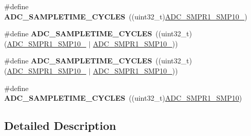 \begin{DoxyCompactItemize}
\#define {\bfseries A\+D\+C\+\_\+\+S\+A\+M\+P\+L\+E\+T\+I\+M\+E\+\_\+C\+Y\+C\+L\+ES}~((uint32\+\_\+t)\mbox{\hyperlink{group___peripheral___registers___bits___definition_ga289d89b4d92d7f685a8e44aeb9ddcded}{A\+D\+C\+\_\+\+S\+M\+P\+R1\+\_\+\+S\+M\+P10\+\_}})
\item 
\mbox{\label{group___a_d_c__sampling__times_ga37d00fbf996e8995c5dd46fc992f027c}} 
\#define {\bfseries A\+D\+C\+\_\+\+S\+A\+M\+P\+L\+E\+T\+I\+M\+E\+\_\+C\+Y\+C\+L\+ES}~((uint32\+\_\+t)(\mbox{\hyperlink{group___peripheral___registers___bits___definition_ga289d89b4d92d7f685a8e44aeb9ddcded}{A\+D\+C\+\_\+\+S\+M\+P\+R1\+\_\+\+S\+M\+P10\+\_}} $\vert$ \mbox{\hyperlink{group___peripheral___registers___bits___definition_ga8a8996c53042759f01e966fb00351ebf}{A\+D\+C\+\_\+\+S\+M\+P\+R1\+\_\+\+S\+M\+P10\+\_}}))
\item 
\mbox{\label{group___a_d_c__sampling__times_ga383fd99e5566555e7f0c249e036c5ccb}} 
\#define {\bfseries A\+D\+C\+\_\+\+S\+A\+M\+P\+L\+E\+T\+I\+M\+E\+\_\+C\+Y\+C\+L\+ES}~((uint32\+\_\+t)(\mbox{\hyperlink{group___peripheral___registers___bits___definition_ga289d89b4d92d7f685a8e44aeb9ddcded}{A\+D\+C\+\_\+\+S\+M\+P\+R1\+\_\+\+S\+M\+P10\+\_}} $\vert$ \mbox{\hyperlink{group___peripheral___registers___bits___definition_ga42b96f058436c8bdcfabe1e08c7edd61}{A\+D\+C\+\_\+\+S\+M\+P\+R1\+\_\+\+S\+M\+P10\+\_}}))
\item 
\mbox{\label{group___a_d_c__sampling__times_gaa39649d790cb2ca115171db71604652d}} 
\#define {\bfseries A\+D\+C\+\_\+\+S\+A\+M\+P\+L\+E\+T\+I\+M\+E\+\_\+C\+Y\+C\+L\+ES}~((uint32\+\_\+t)\mbox{\hyperlink{group___peripheral___registers___bits___definition_ga32242a2c2156a012a7343bcb43d490d0}{A\+D\+C\+\_\+\+S\+M\+P\+R1\+\_\+\+S\+M\+P10}})
\end{DoxyCompactItemize}


\subsection{Detailed Description}

